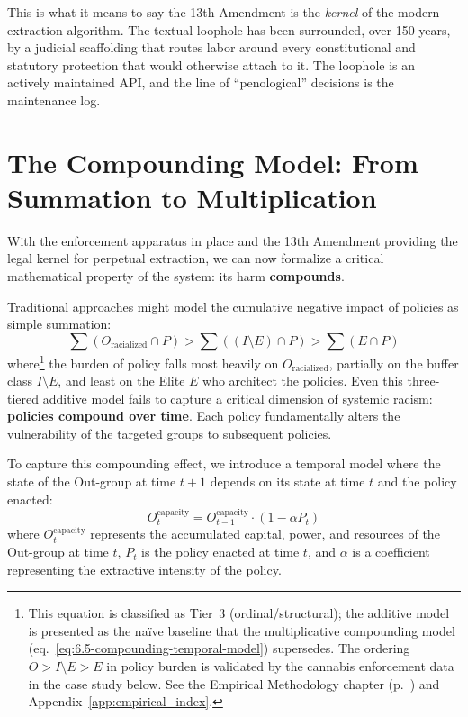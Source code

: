 This is what it means to say the 13th Amendment is the \textit{kernel} of the modern extraction algorithm. The textual loophole has been surrounded, over 150 years, by a judicial scaffolding that routes labor around every constitutional and statutory protection that would otherwise attach to it. The loophole is an actively maintained API, and the line of ``penological'' decisions is the maintenance log.

\section{The Compounding Model: From Summation to Multiplication}

With the enforcement apparatus in place and the 13th Amendment providing the legal kernel for perpetual extraction, we can now formalize a critical mathematical property of the system: its harm \textbf{compounds}.

Traditional approaches might model the cumulative negative impact of policies as simple summation:
\begin{equation}\label{eq:6.4-additive-policy-model}
\sum (O_{\text{racialized}} \cap P) > \sum ((I \setminus E) \cap P) > \sum (E \cap P)
\end{equation}
where\footnote{This equation is classified as Tier~3 (ordinal/structural); the additive model is presented as the na\"{i}ve baseline that the multiplicative compounding model (eq.~\ref{eq:6.5-compounding-temporal-model}) supersedes. The ordering $O > I \setminus E > E$ in policy burden is validated by the cannabis enforcement data in the case study below. See the Empirical Methodology chapter (p.~\pageref{ch:empirical_methodology}) and Appendix~\ref{app:empirical_index}.} the burden of policy falls most heavily on $O_{\text{racialized}}$, partially on the buffer class $I \setminus E$, and least on the Elite $E$ who architect the policies. Even this three-tiered additive model fails to capture a critical dimension of systemic racism: \textbf{policies compound over time}. Each policy fundamentally alters the vulnerability of the targeted groups to subsequent policies.

To capture this compounding effect, we introduce a temporal model where the state of the Out-group at time $t+1$ depends on its state at time $t$ and the policy enacted:
\begin{equation}\label{eq:6.5-compounding-temporal-model}
O_t^{\text{capacity}} = O_{t-1}^{\text{capacity}} \cdot (1 - \alpha P_t)
\end{equation}
where $O_t^{\text{capacity}}$ represents the accumulated capital, power, and resources of the Out-group at time $t$, $P_t$ is the policy enacted at time $t$, and $\alpha$ is a coefficient representing the extractive intensity of the policy.

